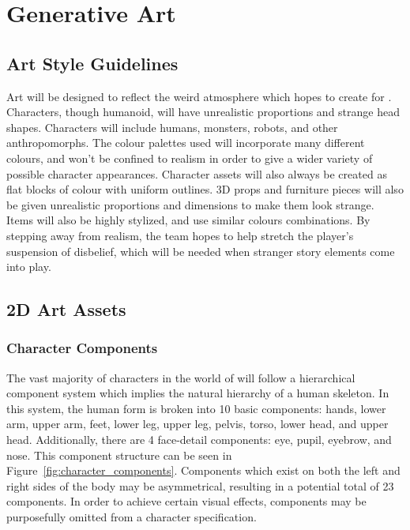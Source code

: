 \section{Generative Art}

\subsection{Art Style Guidelines}
Art will be designed to reflect the weird atmosphere which \ourteam{} hopes to create for \ourgame{}. Characters, though humanoid, will have unrealistic proportions and strange head shapes. Characters will include humans, monsters, robots, and other anthropomorphs. The colour palettes used will incorporate many different colours, and won't be confined to realism in order to give a wider variety of possible character appearances. Character assets will also always be created as flat blocks of colour with uniform outlines. 3D props and furniture pieces will also be given unrealistic proportions and dimensions to make them look strange. Items will also be highly stylized, and use similar colours combinations. By stepping away from realism, the team hopes to help stretch the player's suspension of disbelief, which will be needed when stranger story elements come into play.

\subsection{2D Art Assets}       

\subsubsection{Character Components}
The vast majority of characters in the world of \ourgame{} will follow a hierarchical component system which implies the natural hierarchy of a human skeleton. In this system, the human form is broken into 10 basic components: hands, lower arm, upper arm, feet, lower leg, upper leg, pelvis, torso, lower head, and upper head. Additionally, there are 4 face-detail components: eye, pupil, eyebrow, and nose. This component structure can be seen in Figure~\ref{fig:character_components}. Components which exist on both the left and right sides of the body may be asymmetrical, resulting in a potential total of 23 components. In order to achieve certain visual effects, components may be purposefully omitted from a character specification.

